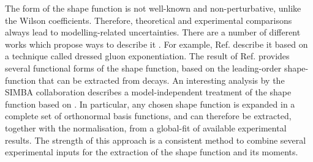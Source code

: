 The form of the shape function is not well-known and non-perturbative, unlike the Wilson coefficients.
Therefore, theoretical and experimental comparisons always lead to modelling-related uncertainties.
There are a number of different works which propose ways to describe it \cite{Benson:2004sg,Lange:2005yw,Andersen:2005mj,Gambino:2007rp,Aglietti:2007ik,Bernlochner:2020jlt}.
For example, Ref. \cite{Andersen:2005mj} describe it based on a technique called dressed gluon exponentiation.
The result of Ref. \cite{Lange:2005yw} provides several functional forms of the shape function, based on the leading-order shape-function that can be extracted from \BtoXsgamma decays.
An interesting analysis by the SIMBA collaboration \cite{Bernlochner:2020jlt} describes a model-independent treatment of the shape function based on .
In particular, any chosen shape function is expanded in a complete set of orthonormal basis functions, and can therefore be extracted, together with the normalisation, from a global-fit of available experimental results.
The strength of this approach is a consistent method to combine several experimental inputs for the extraction of the shape function and its moments.


